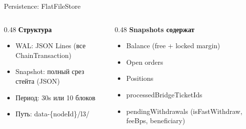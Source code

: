 \documentclass[aspectratio=169]{beamer}
\begin{document}
\begin{frame}{Persistence: FlatFileStore}

\begin{columns}[t]
\begin{column}{0.48\textwidth}
\textbf{Структура}
\begin{itemize}
    \item WAL: JSON Lines (все ChainTransaction)
    \item Snapshot: полный срез стейта (JSON)
    \item Период: 30s или 10 блоков
    \item Путь: data-\{nodeId\}/l3/
\end{itemize}
\end{column}
\begin{column}{0.48\textwidth}
\textbf{Snapshots содержат}
\begin{itemize}
    \item Balance (free + locked margin)
    \item Open orders
    \item Positions
    \item processedBridgeTicketIds
    \item pendingWithdrawals (isFastWithdraw, feeBps, beneficiary)
\end{itemize}
\end{column}
\end{columns}
\end{frame}
\end{document}
